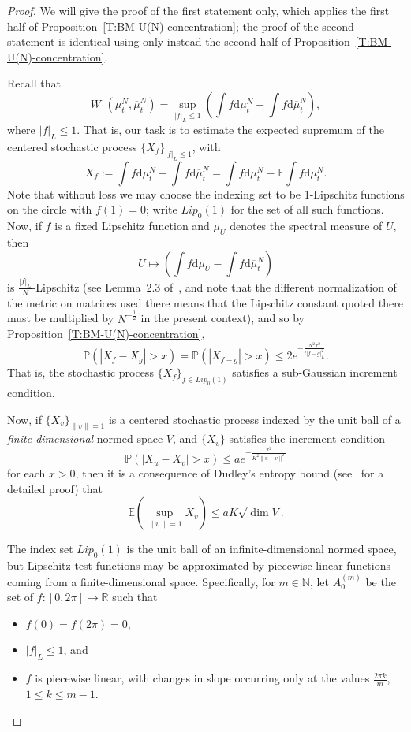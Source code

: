 \documentclass[11pt]{article}
\theoremstyle{definition}
\numberwithin{equation}{section}
\numberwithin{figure}{section}
\numberwithin{table}{section}
\newcommand{\R}{\mathbb{R}}
\newcommand{\E}{\mathbb{E}}
\newcommand{\Prob}{\mathbb{P}}
\newcommand{\N}{\mathbb{N}}
\newcommand*{\dd}{\mathrm{d}}
\newcommand*{\dmu}{\dd \mu}
\newcommand*{\dbmu}{\dd \overline{\mu}}
\begin{document}
\begin{proof}
We will give the proof of the first statement only, which applies the first half of Proposition~\ref{T:BM-U(N)-concentration}; the proof of the second statement is identical using only instead the second half of Proposition~\ref{T:BM-U(N)-concentration}.

Recall that
\[
W_1(\mu^N_t,\overline{\mu}^N_t)=\sup_{|f|_L\le 1}\left(\int f\dmu^N_t-\int f\dbmu^N_t\right),
\]
where $|f|_L\le 1$. That is, our task is to estimate the expected supremum of the centered stochastic process $\{X_f\}_{|f|_L\le 1}$, with
\[
X_f:=\int f\dmu^N_t-\int f\dbmu^N_t=\int f\dmu^N_t-\E\int f\dmu^N_t.
\]
Note that without loss we may choose the indexing set to be 1-Lipschitz functions on the circle with $f(1)=0$; write $Lip_0(1)$ for the set of all such functions. Now, if $f$ is a fixed Lipschitz function and $\mu_U$ denotes the spectral measure of $U$, then
\[
U\longmapsto \left(\int f\dmu_U-\int f\dbmu^N_t\right)
\]
is $\frac{|f|_L}{N}$-Lipschitz (see Lemma~2.3 of~\cite{MM-PTRF-2013}, and note that the different normalization of the metric on matrices used there means that the Lipschitz constant quoted there must be multiplied by $N^{-\frac{1}{2}}$ in the present context), and so by Proposition~\ref{T:BM-U(N)-concentration},
\[
\Prob\left(|X_f-X_g|>x\right)=\Prob\left(|X_{f-g}|>x\right)\le 2e^{-\frac{N^2x^2}{t|f-g|_L^2}}.
\]
That is, the stochastic process $\{X_f\}_{f\in Lip_0(1)}$ satisfies a sub-Gaussian increment condition.

Now, if $\{X_v\}_{\|v\|=1}$ is a centered stochastic process indexed by the unit ball of a \emph{finite-dimensional} normed space $V$, and $\{X_v\}$ satisfies the increment condition
\[
\Prob(|X_u-X_v|>x)\le a e^{-\frac{x^2}{K^2\|u-v\|^2}}
\]
for each $x>0$, then it is a consequence of Dudley's entropy bound (see~\cite{MM2016} for a detailed proof) that
\begin{equation}\label{E:fd-sup-bound}
\E\left(\sup_{\|v\|=1}X_v\right)\le aK\sqrt{\dim V}.
\end{equation}


The index set $Lip_0(1)$ is the unit ball of an infinite-dimensional normed space, but Lipschitz test functions may be approximated by piecewise linear functions coming from a finite-dimensional space. Specifically, for $m\in\N$, let $A_0^{(m)}$ be the set of $f:[0,2\pi]\to\R$ such that
\begin{itemize}
\item $f(0)=f(2\pi)=0$,
\item $|f|_L\le 1$, and
\item $f$ is piecewise linear, with changes in slope occurring only at the values $\frac{2\pi k}{m}$, $1\le k\le m-1$.
\end{itemize}


\end{proof}
\end{document}
